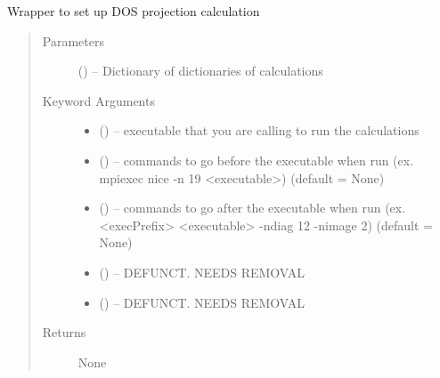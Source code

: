 \documentclass[letterpaper,10pt,english]{sphinxmanual}
\begin{document}
\begin{fulllineitems}
\label{\detokenize{run:run.pdos}}
Wrapper to set up DOS projection calculation
\begin{quote}\begin{description}
\item[{Parameters}] \leavevmode
{} () -- Dictionary of dictionaries of calculations

\item[{Keyword Arguments}] \leavevmode\begin{itemize}
\item {} 
 () -- executable that you are calling to run the calculations

\item {} 
 () -- commands to go before the executable when run
(ex. mpiexec nice -n 19 \textless{}executable\textgreater{}) (default = None)

\item {} 
 () -- commands to go after the executable when run
(ex. \textless{}execPrefix\textgreater{} \textless{}executable\textgreater{} -ndiag 12 -nimage 2) (default = None)

\item {} 
 () -- DEFUNCT. NEEDS REMOVAL

\item {} 
 () -- DEFUNCT. NEEDS REMOVAL

\end{itemize}

\item[{Returns}] \leavevmode
None

\end{description}\end{quote}

\end{fulllineitems}

\end{document}
